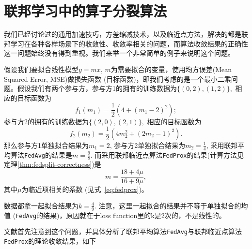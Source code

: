 \section{联邦学习中的算子分裂算法}
\label{sec:chap2-operator-split}

我们已经讨论过的通用加速技巧\cite{reddi2020fed_opt}，方差缩减技术\cite{karimireddy2020scaffold}，以及临近点方法\cite{sahu2018fedprox}，解决的都是联邦学习在各种各样场景下的收敛性、收敛率相关的问题，而算法收敛结果的正确性这一问题始终没有得到重视。我们来举一个非常简单的例子来说明这个问题。

\begin{example}
\label{eg:correctness}
假设我们要拟合线性模型$y = mx$, $m$为需要拟合的变量，使用均方误差(Mean Squared Error, MSE)做损失函数 (目标函数)，即我们考虑的是一个最小二乘问题。假设我们有两个参与方，参与方1的拥有的训练数据为$\{ (0, 2), (1, 2) \},$ 相应的目标函数为
\begin{equation*}
f_1(m_1) = \frac{1}{2} (4 + (m_1 - 2)^2);
\end{equation*}
参与方2的拥有的训练数据为$\{ (2, 0), (2, 1) \},$ 相应的目标函数为
\begin{equation*}
f_2(m_2) = \frac{1}{2} (4m_2^2 + (2m_2 - 1)^2).
\end{equation*}
那么参与方1单独拟合结果为$m_1 = 2$, 参与方2单独拟合结果为$m_2 = \frac{1}{4}$, 采用联邦平均算法\texttt{FedAvg}的结果是$m = \frac{9}{8}.$ 而采用联邦临近点算法\texttt{FedProx}的结果(计算方法见定理\ref{thm:fedsplit-correctness})是
\begin{equation}
\label{eq:eg-correctness-fedprox}
m = \frac{18 + 4\mu}{16 + 9\mu},
\end{equation}
其中$\mu$为临近项相关的系数 (见式~\eqref{eq:fedprox})。

数据都拿一起拟合结果为$k = \frac{4}{9}.$ 注意，这里一起拟合的结果并不等于单独拟合的均值 (\texttt{FedAvg}的结果)，原因就在于loss function里的k是2次的，不是线性的。
\end{example}

文献\cite{pathak2020fedsplit}首先注意到这个问题，并具体分析了联邦平均算法\texttt{FedAvg}与联邦临近点算法\texttt{FedProx}的理论收敛结果，如下

